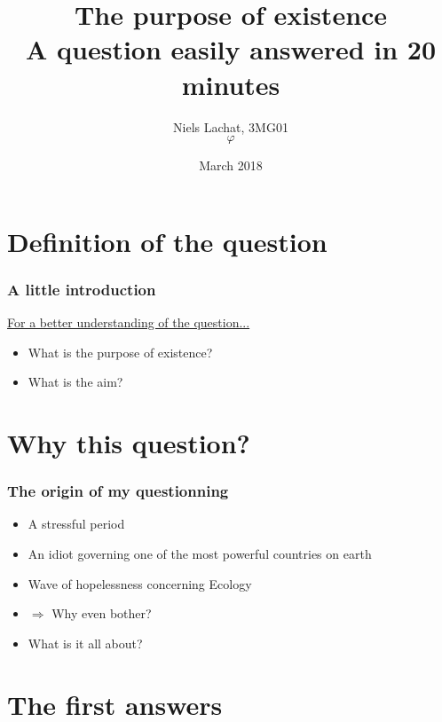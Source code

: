 \documentclass{beamer}
\title{The purpose of existence \\ A question easily answered in 20 minutes}
\author{Niels Lachat, 3MG01 \\ $\varphi$}
\date{March 2018}
\begin{document}
	\maketitle
	
	\tableofcontents
	
	\section{Definition of the question}
	
	\begin{frame}
		\frametitle{A little introduction} 
		\href{../orig.gif}{For a better understanding of the question...} \pause
		
		\begin{itemize}[<+->]
			\item What is the purpose of existence?
			\item What is the aim? 
		\end{itemize}
    \end{frame}
    
    
    \section{Why this question?}
    
    \begin{frame}
    		\frametitle{The origin of my questionning}
    		
    		\begin{itemize}[<+->]
    			\item A stressful period 
    			\item An idiot governing one of the most powerful countries on earth
    			\item Wave of hopelessness concerning Ecology
    			\item $\Rightarrow$ Why even bother? 
    			\item What is it all about?
    		\end{itemize}
    \end{frame}
    
    
    \section{The first answers}
    
\end{document}
